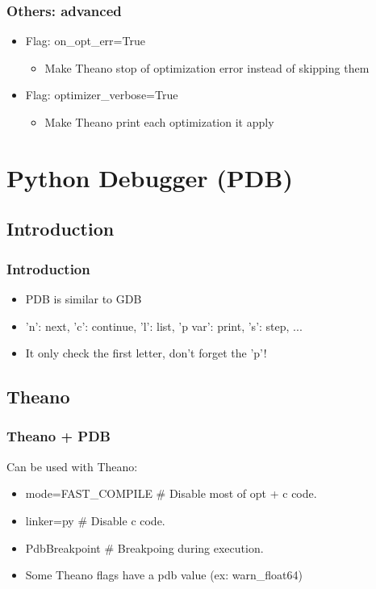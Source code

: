 \documentclass[utf8x,xcolor=pdftex,dvipsnames,table]{beamer}
\begin{document}
\begin{frame}
  \frametitle{Others: advanced}
  \begin{itemize}
  \item Flag: on\_opt\_err=True
    \begin{itemize}
    \item Make Theano stop of optimization error instead of skipping them
    \end{itemize}
  \item Flag: optimizer\_verbose=True
    \begin{itemize}
    \item Make Theano print each optimization it apply
    \end{itemize}
  \end{itemize}
\end{frame}

\section{Python Debugger (PDB)}
\subsection{Introduction}
\begin{frame}
  \frametitle{Introduction}
  \begin{itemize}
  \item PDB is similar to GDB
  \item 'n': next, 'c': continue, 'l': list, 'p var': print, 's': step, ...
  \item It only check the first letter, don't forget the 'p'!
  \end{itemize}
\end{frame}

\subsection{Theano}
\begin{frame}
  \frametitle{Theano + PDB}
  Can be used with Theano:
  \begin{itemize}
    \item mode=FAST\_COMPILE \# Disable most of opt + c code.
    \item linker=py \# Disable c code.
    \item PdbBreakpoint \# Breakpoing during execution.
    \item Some Theano flags have a pdb value (ex: warn\_float64)
  \end{itemize}
\end{frame}
\end{document}
